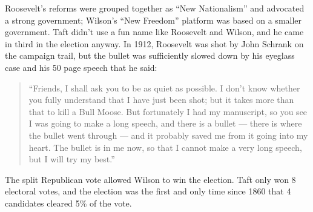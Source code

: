 Roosevelt's reforms were grouped together as ``New Nationalism'' and advocated a strong government;
Wilson's ``New Freedom'' platform was based on a smaller government.
Taft didn't use a fun name like Roosevelt and Wilson, and he came in third in the election anyway.
In 1912, Roosevelt was shot by John Schrank on the campaign trail,
but the bullet was sufficiently slowed down by his eyeglass case and his 50 page speech that he said:

\begin{quotation}
  ``Friends, I shall ask you to be as quiet as possible.
  I don't know whether you fully understand that I have just been shot;
  but it takes more than that to kill a Bull Moose.
  But fortunately I had my manuscript, so you see I was going to make a long speech, and there is a bullet ---
  there is where the bullet went through --- and it probably saved me from it going into my heart.
  The bullet is in me now, so that I cannot make a very long speech, but I will try my best.''
\end{quotation}

The split Republican vote allowed Wilson to win the election.
Taft only won 8 electoral votes,
and the election was the first and only time since 1860 that 4 candidates cleared 5\% of the vote.

